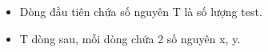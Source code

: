 \begin{itemize}
	\item     Dòng đầu tiên chứa số nguyên T là số lượng test.   
	\item     T dòng sau, mỗi dòng chứa 2 số nguyên x, y.   
\end{itemize}